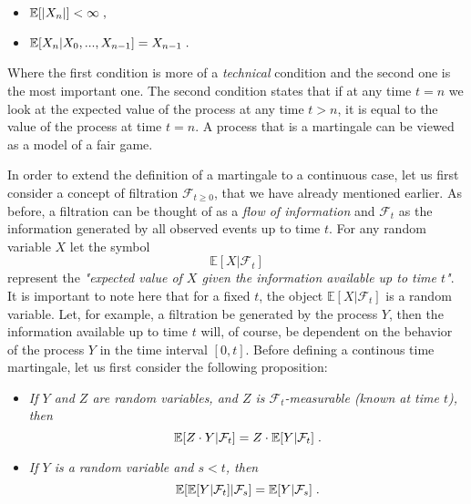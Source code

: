 \documentclass[times, utf8, diplomski]{fer}
\begin{document}
\begin{center}
	\begin{itemize}
		\item $\mathbb{E}[|X_n|] < \infty \hspace{0.1cm},$
		\item $\mathbb{E}[X_n | X_0, ..., X_{n-1}] = X_{n-1} \hspace{0.1cm}.$
	\end{itemize}
\end{center}

\noindent Where the first condition is more of a \textit{technical} condition and the second one is the most important one. The second condition states that if at any time $t=n$ we look at the expected value of the process at any time $t>n$, it is equal to the value of the process at time $t=n$. A process that is a martingale can be viewed as a model of a fair game.

\noindent In order to extend the definition of a martingale to a continuous case, let us first consider a concept of filtration ${\mathcal{F}}_{t \ge 0}$, that we have already mentioned earlier. As before, a filtration can be thought of as a \textit{flow of information} and $\mathcal{F}_t$ as the information generated by all observed events up to time $t$. For any random variable $X$ let the symbol
$$\mathbb{E}[X|\mathcal{F}_t]$$
represent the \textit{"expected value of $X$ given the information available up to time $t$"}. It is important to note here that for a fixed $t$, the object $\mathbb{E}[X|\mathcal{F}_t]$ is a random variable. Let, for example, a filtration be generated by the process $Y$, then the information available up to time $t$ will, of course, be dependent on the behavior of the process $Y$ in the time interval $[0,t]$. Before defining a continous time martingale, let us first consider the following proposition:

\begin{itemize}
	\item \textit{If $Y$ and $Z$ are random variables, and $Z$ is $\mathcal{F}_t$-measurable (known at time $t$), then} $$\mathbb{E}[Z\cdot Y|\mathcal{F}_t] = Z \cdot \mathbb{E}[Y|\mathcal{F}_t]\hspace{0.1cm}.$$
	\item \textit{If $Y$ is a random variable and $s<t$, then} $$\mathbb{E}[\mathbb{E}[Y|\mathcal{F}_t]|\mathcal{F}_s] = \mathbb{E}[Y|\mathcal{F}_s]\hspace{0.1cm}.$$
\end{itemize}
\end{document}
